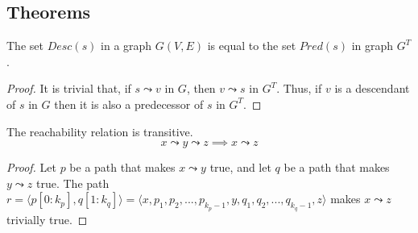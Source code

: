 \subsection{Theorems}
\begin{theorem}
    The set $Desc(s)$ in a graph $G(V,E)$ is equal to the set $Pred(s)$ in graph $G^T$.
\end{theorem}
\begin{proof}
    It is trivial that, if $s \leadsto v$ in $G$, then $v \leadsto s$ in $G^T$. Thus, if $v$ is a descendant of $s$ in $G$ then it is also a predecessor of $s$ in $G^T$.
\end{proof}
\begin{theorem}
    The reachability relation is transitive.
    \begin{equation*}
        x \leadsto y \leadsto z \implies x \leadsto z
    \end{equation*}
\end{theorem}
\begin{proof}
Let $p$ be a path that makes $x \leadsto y$ true, and let $q$ be a path that makes $y \leadsto z$ true. The path $r = \langle p[0:k_p], q[1:k_q] \rangle = \langle x, p_1, p_2,...,p_{k_p-1},y,q_1,q_2,...,q_{k_q-1}, z \rangle$ makes $x \leadsto z$ trivially true.
\end{proof}
